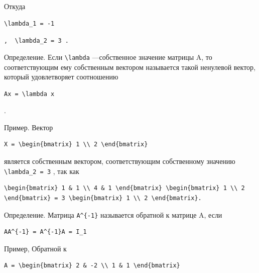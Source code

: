 \documentclass[
  ukrainian,
]{article}
\begin{document}
Откуда

\begin{verbatim}
\lambda_1 = -1
\end{verbatim}

\texttt{,\ \ \textquotesingle{}\textbackslash{}lambda\_2\ =\ 3\textquotesingle{}\ .}

Определение. Если \texttt{\textbackslash{}lambda} ---собственное
значение матрицы A, то соответствующим ему собственным вектором
называется такой ненулевой вектор, который удовлетворяет соотношению

\begin{verbatim}
Ax = \lambda x
\end{verbatim}

.

Пример. Вектор

\begin{verbatim}
X = \begin{bmatrix} 1 \\ 2 \end{bmatrix}
\end{verbatim}

является собственным вектором, соответствующим собственному значению
\texttt{\textbackslash{}lambda\_2\ =\ 3} , так как

\begin{verbatim}
\begin{bmatrix} 1 & 1 \\ 4 & 1 \end{bmatrix} \begin{bmatrix} 1 \\ 2 \end{bmatrix} = 3 \begin{bmatrix} 1 \\ 2 \end{bmatrix}.
\end{verbatim}

Определение. Матрица \texttt{A\^{}\{-1\}} называется обратной к матрице
A, если

\begin{verbatim}
AA^{-1} = A^{-1}A = I_1
\end{verbatim}

Пример, Обратной к

\begin{verbatim}
A = \begin{bmatrix} 2 & -2 \\ 1 & 1 \end{bmatrix}
\end{verbatim}
\end{document}
